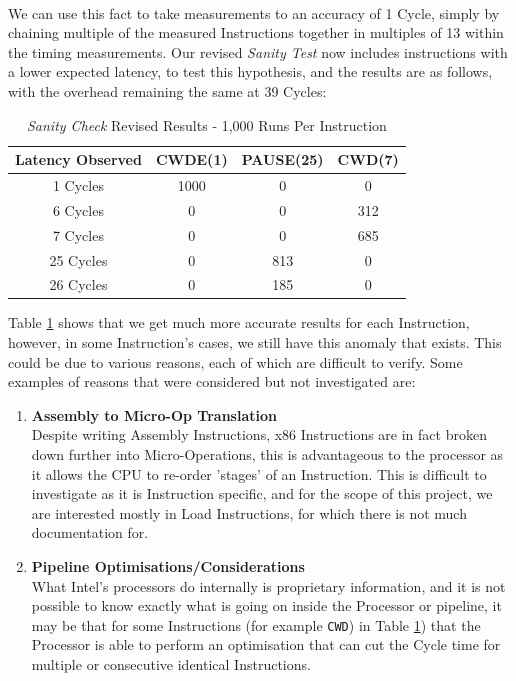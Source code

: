\documentclass[bsc,frontabs,twoside,singlespacing,parskip,deptreport]{infthesis}     %
\begin{document}
\\
We can use this fact to take measurements to an accuracy of 1 Cycle, simply by chaining multiple of the measured Instructions together in multiples of 13 within the timing measurements. Our revised \textit{Sanity Test} now includes instructions with a lower expected latency, to test this hypothesis, and the results are as follows, with the overhead remaining the same at 39 Cycles:

\begin{table}[!h]
\begin{center}
\caption{\textit{Sanity Check} Revised Results - 1,000 Runs Per Instruction}
\label{fig:sanity-results-2}
\begin{tabular}{ |c||c|c|c| } 
    \hline
    Latency Observed & CWDE(1) & PAUSE(25) & CWD(7) \\
    \hline
    1 Cycles   & 1000 & 0   & 0   \\
    6 Cycles   & 0    & 0   & 312 \\
    7 Cycles   & 0    & 0   & 685 \\
    25 Cycles  & 0    & 813 & 0 \\
    26 Cycles  & 0    & 185 & 0   \\
    \hline
\end{tabular}
\end{center}
\end{table}

Table \ref{fig:sanity-results-2} shows that we get much more accurate results for each Instruction, however, in some Instruction's cases, we still have this anomaly that exists. This could be due to various reasons, each of which are difficult to verify. Some examples of reasons that were considered but not investigated are:

\begin{enumerate}
    \item{{\bf Assembly to Micro-Op Translation} \\
        Despite writing Assembly Instructions, x86 Instructions are in fact broken down further into Micro-Operations, this is advantageous to the processor as it allows the CPU to re-order 'stages' of an Instruction. This is difficult to investigate as it is Instruction specific, and for the scope of this project, we are interested mostly in Load Instructions, for which there is not much documentation for.
    }
    \item{{\bf Pipeline Optimisations/Considerations} \\
        What Intel's processors do internally is proprietary information, and it is not possible to know exactly what is going on inside the Processor or pipeline, it may be that for some Instructions (for example \texttt{CWD}) in Table \ref{fig:sanity-results-2}) that the Processor is able to perform an optimisation that can cut the Cycle time for multiple or consecutive identical Instructions.
    }
\end{enumerate}
\end{document}

